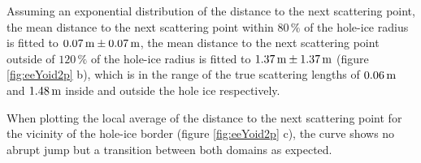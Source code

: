 Assuming an exponential distribution of the distance to the next
scattering point, the mean distance to the next scattering point within
\(80\,\%\) of the hole-ice radius is fitted to \(0.07\text{\,m} \pm 0.07\text{\,m}\),
the mean distance to the next scattering point outside of \(120\,\%\) of
the hole-ice radius is fitted to \(1.37\text{\,m}\pm 1.37\text{\,m}\) (figure
\ref{fig:eeYoid2p} b), which is in the range of the true scattering
lengths of \(0.06\text{\,m}\) and \(1.48\text{\,m}\) inside and outside the hole ice
respectively.

When plotting the local average of the distance to the next scattering
point for the vicinity of the hole-ice border (figure \ref{fig:eeYoid2p}
c), the curve shows no abrupt jump but a transition between both domains
as expected.
